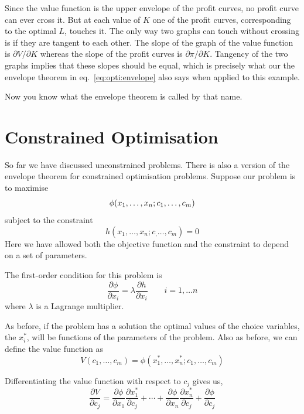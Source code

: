 \documentclass[11pt,reqno,openany]{amsbook}
\theoremstyle{plain}
\theoremstyle{definition}
\begin{document}
Since the value function is the upper envelope of the profit curves,
no profit curve can ever cross it. But at each value of $K$ one of the
profit curves, corresponding to the optimal $L$, touches it. The only
way two graphs can touch without crossing is if they are tangent to
each other. The slope of the graph of the value function is $\partial
V/\partial K$ whereas the slope of the profit curves is $\partial
\pi/\partial K$. Tangency of the two graphs implies that these slopes
should be equal, which is precisely what our the envelope theorem in
eq.~\eqref{eq:opti:envelope} also says when applied to this example.

Now you know what the envelope theorem is called by that name.

\section{Constrained Optimisation}
So far we have discussed unconstrained problems. There is also a
version of the envelope theorem for constrained optimisation problems.
Suppose our problem is to maximise
\begin{equation*}
\phi(x_1,\ldots,x_n;c_1,\ldots,c_m)\\
\end{equation*}
subject to the constraint
\begin{equation}\label{eq:opti:constraint}
h(x_1,\ldots,x_n;c_,\ldots,c_m)=0
\end{equation}
Here we have allowed both the objective function and the constraint to
depend on a set of parameters.

The first-order condition for this problem is
\begin{equation}\label{eq:opti:cfoc}
\frac{\partial \phi}{\partial x_i}
=\lambda \frac{\partial h}{\partial  x_i}
\qquad i=1,\ldots n
\end{equation}
where $\lambda$ is a Lagrange multiplier.

As before, if the problem has a solution the optimal values of the
choice variables, the $x_i^*$, will be functions of the parameters of
the problem. Also as before, we can define the value function as
\[V(c_1,\ldots,c_m)=\phi(x_1^*,\ldots,x_n^*;c_1,\ldots,c_m)\]

Differentiating the value function with respect to $c_j$ gives us,
\begin{equation}\label{eq:opti:value-chain}
\frac{\partial V}{\partial c_j}=
\frac{\partial \phi}{\partial x_1}\frac{\partial x^*_1}{\partial c_j}
+\cdots
+\frac{\partial \phi}{\partial x_n}\frac{\partial x^*_n}{\partial c_j}
+\frac{\partial \phi}{\partial c_j}
\end{equation}
\end{document}
